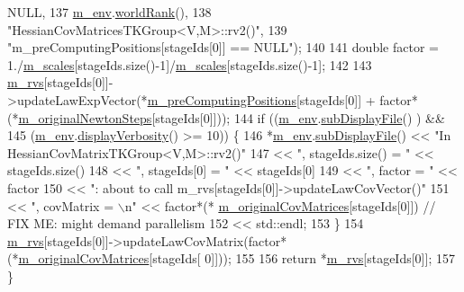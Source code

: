 \begin{DoxyCode}
      NULL,
137                       \hyperlink{class_q_u_e_s_o_1_1_base_t_k_group_a2bce5e8aa5c844d4332a0e73cf00a1f9}{m\_env}.\hyperlink{class_q_u_e_s_o_1_1_base_environment_a78b57112bbd0e6dd0e8afec00b40ffa7}{worldRank}(),
138                       \textcolor{stringliteral}{"HessianCovMatricesTKGroup<V,M>::rv2()"},
139                       \textcolor{stringliteral}{"m\_preComputingPositions[stageIds[0]] == NULL"});
140 
141   \textcolor{keywordtype}{double} factor = 1./\hyperlink{class_q_u_e_s_o_1_1_base_t_k_group_ad36d4dc6f4812e3e10d8090f0dbb9e40}{m\_scales}[stageIds.size()-1]/\hyperlink{class_q_u_e_s_o_1_1_base_t_k_group_ad36d4dc6f4812e3e10d8090f0dbb9e40}{m\_scales}[stageIds.size()-1];
142 
143   \hyperlink{class_q_u_e_s_o_1_1_base_t_k_group_a87c6b02ea45ab3de634c22afa58f53a5}{m\_rvs}[stageIds[0]]->updateLawExpVector(*\hyperlink{class_q_u_e_s_o_1_1_base_t_k_group_a93d7fe55e30a7c6f209b01cb8a67e322}{m\_preComputingPositions}[stageIds[0]] 
      + factor*(*\hyperlink{class_q_u_e_s_o_1_1_hessian_cov_matrices_t_k_group_a4c0fe3171a35cdd453a4e23e1438ddf9}{m\_originalNewtonSteps}[stageIds[0]]));
144   \textcolor{keywordflow}{if} ((\hyperlink{class_q_u_e_s_o_1_1_base_t_k_group_a2bce5e8aa5c844d4332a0e73cf00a1f9}{m\_env}.\hyperlink{class_q_u_e_s_o_1_1_base_environment_a8a0064746ae8dddfece4229b9ad374d6}{subDisplayFile}()        ) &&
145       (\hyperlink{class_q_u_e_s_o_1_1_base_t_k_group_a2bce5e8aa5c844d4332a0e73cf00a1f9}{m\_env}.\hyperlink{class_q_u_e_s_o_1_1_base_environment_a1fe5f244fc0316a0ab3e37463f108b96}{displayVerbosity}() >= 10)) \{
146     *\hyperlink{class_q_u_e_s_o_1_1_base_t_k_group_a2bce5e8aa5c844d4332a0e73cf00a1f9}{m\_env}.\hyperlink{class_q_u_e_s_o_1_1_base_environment_a8a0064746ae8dddfece4229b9ad374d6}{subDisplayFile}() << \textcolor{stringliteral}{"In HessianCovMatrixTKGroup<V,M>::rv2()"}
147                             << \textcolor{stringliteral}{", stageIds.size() = "} << stageIds.size()
148                             << \textcolor{stringliteral}{", stageIds[0] = "}     << stageIds[0]
149                             << \textcolor{stringliteral}{", factor = "}          << factor
150                             << \textcolor{stringliteral}{": about to call m\_rvs[stageIds[0]]->updateLawCovVector()"}
151                             << \textcolor{stringliteral}{", covMatrix = \(\backslash\)n"} << factor*(*
      \hyperlink{class_q_u_e_s_o_1_1_hessian_cov_matrices_t_k_group_acc7219917faf933e77694894856fa646}{m\_originalCovMatrices}[stageIds[0]]) \textcolor{comment}{// FIX ME: might demand parallelism}
152                             << std::endl;
153   \}
154   \hyperlink{class_q_u_e_s_o_1_1_base_t_k_group_a87c6b02ea45ab3de634c22afa58f53a5}{m\_rvs}[stageIds[0]]->updateLawCovMatrix(factor*(*\hyperlink{class_q_u_e_s_o_1_1_hessian_cov_matrices_t_k_group_acc7219917faf933e77694894856fa646}{m\_originalCovMatrices}[stageIds[
      0]]));
155 
156   \textcolor{keywordflow}{return} *\hyperlink{class_q_u_e_s_o_1_1_base_t_k_group_a87c6b02ea45ab3de634c22afa58f53a5}{m\_rvs}[stageIds[0]];
157 \}
\end{DoxyCode}
